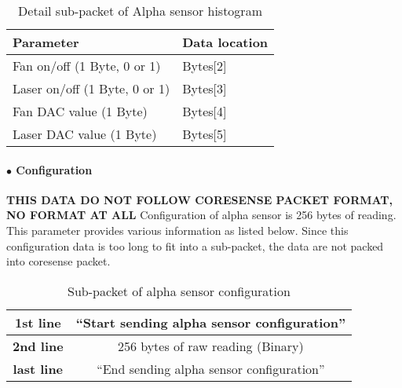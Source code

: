 \begin{table}[h!]
    \centering
    \caption{Detail sub-packet of Alpha sensor histogram}
    \begin{tabular}{|>{\centering\arraybackslash}p{}|>{\centering\arraybackslash}p{}|}
        \hline
        \rowcolor{black!8}
        \textbf{Parameter} & \textbf{Data location}\\ \hline
        Fan on/off (1 Byte, 0 or 1) & Bytes[2] \\ \hline
        Laser on/off (1 Byte, 0 or 1) & Bytes[3] \\ \hline
        Fan DAC value (1 Byte) & Bytes[4] \\ \hline
        Laser DAC value (1 Byte) & Bytes[5] \\ \hline
    \end{tabular}
\end{table}


\paragraph{$\bullet$ Configuration}
\textbf{THIS DATA DO NOT FOLLOW CORESENSE PACKET FORMAT, NO FORMAT AT ALL}
Configuration of alpha sensor is 256 bytes of reading. 
This parameter provides various information as listed below.
Since this configuration data is too long to fit into a sub-packet, the data are not packed into coresense packet.


\begin{table}[h!]
    \centering
    \caption{Sub-packet of alpha sensor configuration}
    \begin{tabular}{|a|c|}
        \hline
        \textbf{1st line} & ``Start sending alpha sensor configuration'' \\ \hline
        \textbf{2nd line} & 256 bytes of raw reading (Binary) \\ \hline
        \textbf{last line} & ``End sending alpha sensor configuration'' \\ \hline
    \end{tabular}
\end{table}


